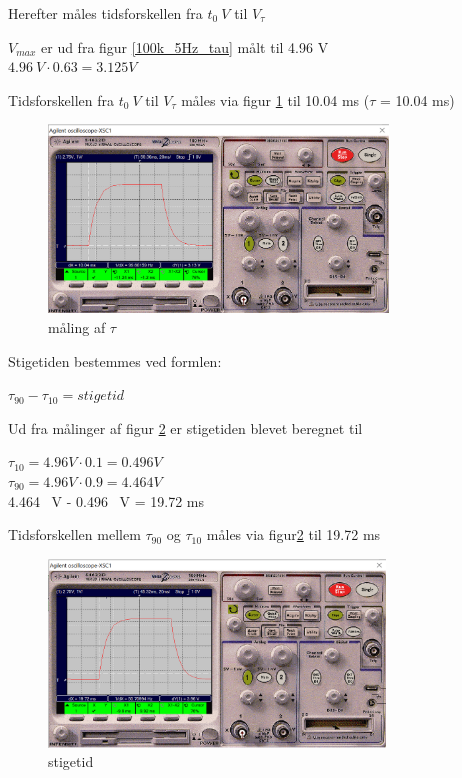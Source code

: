 Herefter måles tidsforskellen fra $t_0 \ V$ til $V_{\tau}$

$V_{max}$ er ud fra figur \ref{100k_5Hz_tau} målt til 4.96 V
\\
$4.96 \ V \cdot 0.63 = 3.125 V$

Tidsforskellen fra $t_0 \ V$ til $V_{\tau}$ måles via figur \ref{100k.5Hz.tau} til 10.04 ms ($\tau$ = 10.04 ms)

\begin{figure}[h]
 \begin{center}
  \includegraphics[height=5cm]{P_Fig/figur6_100k_5Hz_tau.png}
  \caption{måling af $\tau$}
  \label{100k.5Hz.tau}
 \end{center}
\end{figure}

\newpage

Stigetiden bestemmes ved formlen:
\begin{center}
$\tau_{90} - \tau_{10} = stigetid$
\end{center}

Ud fra målinger af figur \ref{100k.5Hz.stigetid}
er stigetiden blevet beregnet til

\begin{center}
$\tau_{10} = 4.96 V \cdot 0.1 = 0.496 V$
\\
$\tau_{90} = 4.96 V \cdot 0.9 = 4.464 V$
\\ 4.464 \ V - 0.496 \ V = 19.72 ms
\end{center}

Tidsforskellen mellem $\tau_{90}$ og $\tau_{10}$ måles via figur\ref{100k.5Hz.stigetid} til 19.72 ms

\begin{figure}[h]
 \begin{center}
  \includegraphics[height=5cm]{P_Fig/figur7_100k_5Hz_stigetid.png}
  \caption{stigetid}
  \label{100k.5Hz.stigetid}
 \end{center}
\end{figure}

